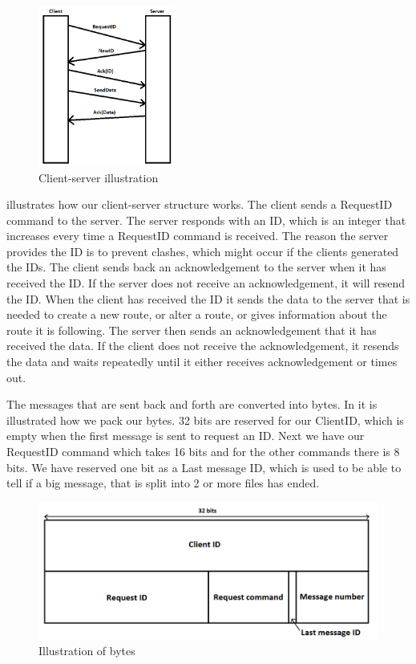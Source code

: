 \begin{figure}[h!]
  \centering
    \includegraphics[width=0.4\textwidth]{figures/clientserver.png}
    \caption{Client-server illustration}
    \label{fig:clientserver}
\end{figure}

 illustrates how our client-server structure works. The client sends a RequestID command to the server. The server responds with an ID, which is an integer that increases every time a RequestID command is received. The reason the server provides the ID is to prevent clashes, which might occur if the clients generated the IDs. The client sends back an acknowledgement to the server when it has received the ID. If the server does not receive an acknowledgement, it will resend the ID. When the client has received the ID it sends the data to the server that is needed to create a new route, or alter a route, or gives information about the route it is following. The server then sends an acknowledgement that it has received the data. If the client does not receive the acknowledgement, it resends the data and waits repeatedly until it either receives acknowledgement or times out.

The messages that are sent back and forth are converted into bytes. In
 it is illustrated how we pack our bytes. 32 bits are reserved for our ClientID, which is empty when the first message is sent to request an ID. Next we have our RequestID command which takes 16 bits and for the other commands there is 8 bits. We have reserved one bit as a Last message ID, which is used to be able to tell if a big message, that is split into 2 or more files has ended.
\begin{figure}[h!]
  \centering
    \includegraphics[width=1\textwidth]{figures/bytesclientserver.png}
    \caption{Illustration of bytes}
    \label{fig:bytesclientserver}
\end{figure}

